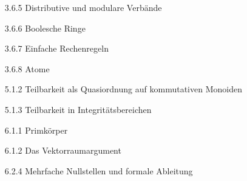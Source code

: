 \begin{itemize}
  \item
  [3.6.5]
  Distributive und modulare Verbände

  \item
  [3.6.6]
  Boolesche Ringe

  \item
  [3.6.7]
  Einfache Rechenregeln

  \item
  [3.6.8]
  Atome

  \item
  [5.1.2]
  Teilbarkeit als Quasiordnung auf kommutativen Monoiden

  \item
  [5.1.3]
  Teilbarkeit in Integritätsbereichen

  \item
  [6.1.1]
  Primkörper

  \item
  [6.1.2]
  Das Vektorraumargument

  \item
  [6.2.4]
  Mehrfache Nullstellen und formale Ableitung

\end{itemize}
